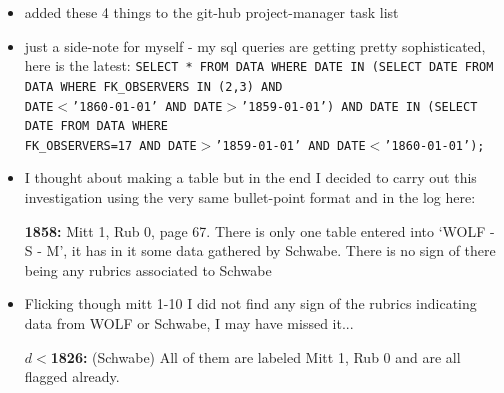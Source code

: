 \documentclass[12pt]{article}
\begin{document}
\begin{itemize}
    \item added these 4 things to the git-hub project-manager task list
    \item just a side-note for myself - my sql queries are getting pretty sophisticated, here is the latest: \texttt{SELECT * FROM DATA WHERE DATE IN (SELECT DATE FROM DATA WHERE FK\_OBSERVERS IN (2,3) AND \\DATE$<$'1860-01-01' AND DATE$>$'1859-01-01') AND DATE IN (SELECT DATE FROM DATA WHERE \\FK\_OBSERVERS=17 AND DATE$>$'1859-01-01' AND DATE$<$'1860-01-01');}
    \item I thought about making a table but in the end I decided to carry out this investigation using the very same bullet-point format and in the log here:
    \item[\textbf{1858:}] Mitt 1, Rub 0, page 67. There is only one table entered into `WOLF - S - M', it has in it some data gathered by Schwabe. There is no sign of there being any rubrics associated to Schwabe
    \item Flicking though mitt 1-10 I did not find any sign of the rubrics indicating data from WOLF or Schwabe, I may have missed it...
    \item[\textbf{$d<$1826:}] (Schwabe) All of them are labeled Mitt 1, Rub 0 and are all flagged already.
\end{itemize}
\end{document}
